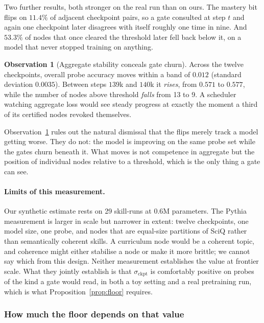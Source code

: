 \documentclass[11pt]{article}
\theoremstyle{plain}
\theoremstyle{definition}
\newtheorem{observation}{Observation}
\theoremstyle{remark}
\begin{document}
Two further results, both stronger on the real run than on ours. The mastery bit
flips on $11.4\%$ of adjacent checkpoint pairs, so a gate consulted at step $t$
and again one checkpoint later disagrees with itself roughly one time in nine.
And $53.3\%$ of nodes that once cleared the threshold later fell back below it,
on a model that never stopped training on anything.

\begin{observation}[Aggregate stability conceals gate churn]
\label{obs:conceal}
Across the twelve checkpoints, overall probe accuracy moves within a band of
$0.012$ (standard deviation $0.0035$). Between steps $139$k and $140$k it
\emph{rises}, from $0.571$ to $0.577$, while the number of nodes above threshold
\emph{falls} from 13 to 9. A scheduler watching aggregate loss would see steady
progress at exactly the moment a third of its certified nodes revoked
themselves.
\end{observation}

Observation~\ref{obs:conceal} rules out the natural dismissal that the flips
merely track a model getting worse. They do not: the model is improving on the
same probe set while the gates churn beneath it. What moves is not competence in
aggregate but the position of individual nodes relative to a threshold, which is
the only thing a gate can see.

\paragraph{Limits of this measurement.} Our synthetic estimate rests on 29
skill-runs at $0.6$M parameters. The Pythia measurement is larger in scale but
narrower in extent: twelve checkpoints, one model size, one probe, and nodes that
are equal-size partitions of SciQ rather than semantically coherent skills. A
curriculum node would be a coherent topic, and coherence might either stabilise a
node or make it more brittle; we cannot say which from this design. Neither
measurement establishes the value at frontier scale. What they jointly establish
is that $\sigma_{\text{ckpt}}$ is comfortably positive on probes of the kind a
gate would read, in both a toy setting and a real pretraining run, which is what
Proposition~\ref{prop:floor} requires.

\subsubsection{How much the floor depends on that value}
\end{document}
